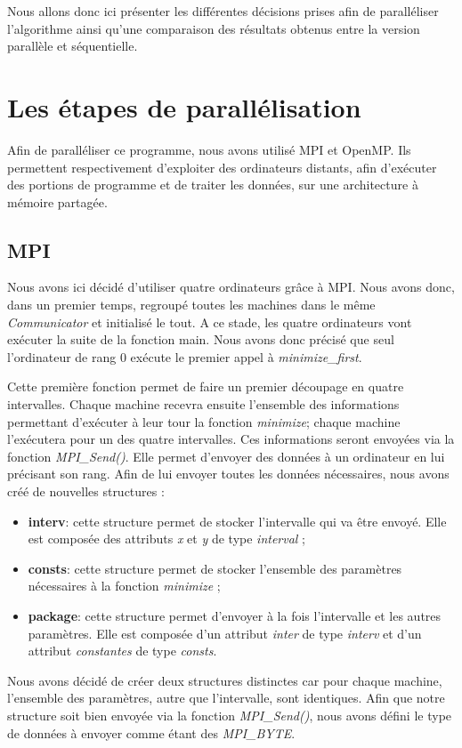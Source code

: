\documentclass[a4paper,10pt]{article}
\begin{document}
Nous allons donc ici présenter les différentes décisions prises afin de paralléliser l'algorithme ainsi qu'une comparaison des résultats obtenus entre la version parallèle et séquentielle.

\newpage
\section{Les étapes de parallélisation}

Afin de paralléliser ce programme, nous avons utilisé MPI et OpenMP. Ils permettent respectivement d'exploiter des ordinateurs distants, afin d'exécuter des portions de programme et de traiter les données, sur une architecture à mémoire partagée. 

\subsection{MPI}
Nous avons ici décidé d'utiliser quatre ordinateurs grâce à MPI. Nous avons donc, dans un premier temps, regroupé toutes les machines dans le même \emph{Communicator} et initialisé le tout. A ce stade, les quatre ordinateurs vont exécuter la suite de la fonction main. Nous avons donc précisé que seul l'ordinateur de rang 0 exécute le premier appel à \emph{minimize\_first}. 

Cette première fonction permet de faire un premier découpage en quatre intervalles. Chaque machine recevra ensuite l'ensemble des informations permettant d'exécuter à leur tour la fonction \emph{minimize}; chaque machine l'exécutera pour un des quatre intervalles. Ces informations seront envoyées via la fonction \emph{MPI\_Send()}. Elle permet d'envoyer des données à un ordinateur en lui précisant son rang. Afin de lui envoyer toutes les données nécessaires, nous avons créé de nouvelles structures : 
\begin{itemize}
\item \textbf{interv}: cette structure permet de stocker l'intervalle qui va être envoyé. Elle est composée des attributs \emph{x} et \emph{y} de type \emph{interval} ; 
\item \textbf{consts}: cette structure permet de stocker l'ensemble des paramètres nécessaires à la fonction \emph{minimize} ; 
\item \textbf{package}: cette structure permet d'envoyer à la fois l'intervalle et les autres paramètres. Elle est composée d'un attribut \emph{inter} de type \emph{interv} et d'un attribut \emph{constantes} de type \emph{consts}. 
\end{itemize}
Nous avons décidé de créer deux structures distinctes car pour chaque machine, l'ensemble des paramètres, autre que l'intervalle, sont identiques.
Afin que notre structure soit bien envoyée via la fonction \emph{MPI\_Send()}, nous avons défini le type de données à envoyer comme étant des \emph{MPI\_BYTE}.
\end{document}
